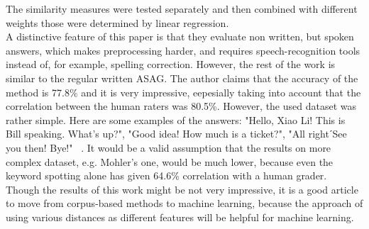 \documentclass[11pt]{report}
\numberwithin{equation}{section} %
\begin{document}
The similarity measures were tested separately and then combined with different weights those were determined by linear regression.\\

A distinctive feature of this paper is that they evaluate non written, but spoken answers, which makes preprocessing harder, and requires speech-recognition tools instead of, for example, spelling correction. However, the rest of the work is similar to the regular written ASAG. The author claims that the accuracy of the method is 77.8\% and it is very impressive, eepesially taking into account that the correlation between the human raters was 80.5\%. However, the used dataset was rather simple. Here are some examples of the answers: "Hello, Xiao Li! This is Bill speaking. What's up?", "Good idea! How much is a ticket?", "All rightˊSee you then! Bye!" ~\cite{Li}. It would be a valid assumption that the results on more complex dataset, e.g. Mohler's one, would be much lower, because even the keyword spotting alone has given 64.6\% correlation with a human grader. Though the results of this work might be not very impressive, it is a good article to move from corpus-based methods to machine learning, because the approach of using various distances as different features will be helpful for machine learning.\\
\end{document}
